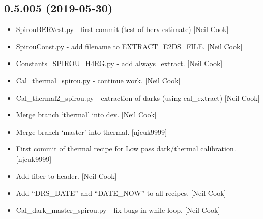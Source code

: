 \documentclass[a4paper,10pt,english]{report}
\begin{document}
\subsection{0.5.005 (2019-05-30)}
\label{\detokenize{misc/changelog:id130}}\begin{itemize}
\item {} 
SpirouBERVest.py - first commit (test of berv estimate) {[}Neil Cook{]}

\item {} 
SpirouConst.py - add filename to EXTRACT\_E2DS\_FILE. {[}Neil Cook{]}

\item {} 
Constants\_SPIROU\_H4RG.py - add always\_extract. {[}Neil Cook{]}

\item {} 
Cal\_thermal\_spirou.py - continue work. {[}Neil Cook{]}

\item {} 
Cal\_thermal2\_spirou.py - extraction of darks (using cal\_extract) {[}Neil
Cook{]}

\item {} 
Merge branch ‘thermal’ into dev. {[}Neil Cook{]}

\item {} 
Merge branch ‘master’ into thermal. {[}njcuk9999{]}

\item {} 
First commit of thermal recipe for Low pass dark/thermal calibration.
{[}njcuk9999{]}

\item {} 
Add fiber to header. {[}Neil Cook{]}

\item {} 
Add “DRS\_DATE” and “DATE\_NOW” to all recipes. {[}Neil Cook{]}

\item {} 
Cal\_dark\_master\_spirou.py - fix bugs in while loop. {[}Neil Cook{]}

\end{itemize}
\end{document}
